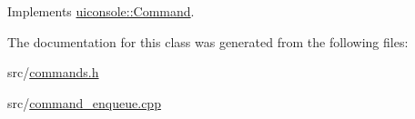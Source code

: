 Implements \hyperlink{classuiconsole_1_1Command_a5c4d205b1de13a6b3d0db73ddc7ebefa}{uiconsole::Command}.



The documentation for this class was generated from the following files:\begin{DoxyCompactItemize}
\item 
src/\hyperlink{commands_8h}{commands.h}\item 
src/\hyperlink{command__enqueue_8cpp}{command\_\-enqueue.cpp}\end{DoxyCompactItemize}
